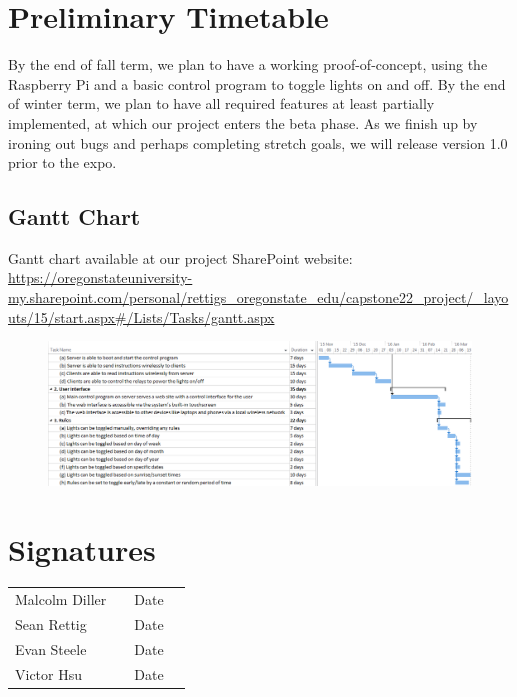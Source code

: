 \documentclass[12pt]{article}
\begin{document}
\section{Preliminary Timetable}

By the end of fall term, we plan to have a working proof-of-concept, using the
Raspberry Pi and a basic control program to toggle lights on and off.  By the
end of winter term, we plan to have all required features at least partially
implemented, at which our project enters the beta phase.  As we finish up by
ironing out bugs and perhaps completing stretch goals, we will release version
1.0 prior to the expo.

\subsection{Gantt Chart}
Gantt chart available at our project SharePoint website: \url{https://oregonstateuniversity-my.sharepoint.com/personal/rettigs_oregonstate_edu/capstone22_project/_layouts/15/start.aspx#/Lists/Tasks/gantt.aspx}
\begin{figure}
\includegraphics[width=1.1\textwidth]{gantt.png}
\end{figure}

\pagebreak

\section{Signatures}

\begin{tabular}{l l l l} Malcolm Diller & \underline{\hspace{6cm}} & Date
\underline{\hspace{2cm}}\\ Sean Rettig & \underline{\hspace{6cm}} & Date
\underline{\hspace{2cm}}\\ Evan Steele & \underline{\hspace{6cm}} & Date
\underline{\hspace{2cm}}\\ Victor Hsu & \underline{\hspace{6cm}} & Date
\underline{\hspace{2cm}} \end{tabular}
    
\end{document}
